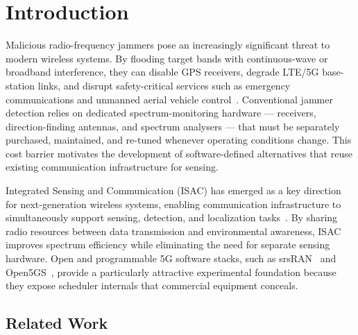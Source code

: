 \documentclass[conference]{IEEEtran}
\begin{document}
\section{Introduction}


Malicious radio-frequency jammers pose an increasingly significant threat
to modern wireless systems. By flooding target bands with continuous-wave
or broadband interference, they can disable GPS receivers, degrade LTE/5G
base-station links, and disrupt safety-critical services such as emergency
communications and unmanned aerial vehicle control~\cite{3gpp38211}.
Conventional jammer detection relies on dedicated spectrum-monitoring
hardware — receivers, direction-finding antennas, and spectrum analysers —
that must be separately purchased, maintained, and re-tuned whenever
operating conditions change. This cost barrier motivates the development
of software-defined alternatives that reuse existing communication
infrastructure for sensing.

Integrated Sensing and Communication (ISAC) has emerged as a key
direction for next-generation wireless systems, enabling communication
infrastructure to simultaneously support sensing, detection, and
localization tasks~\cite{1143830,article}. By sharing radio resources
between data transmission and environmental awareness, ISAC improves
spectrum efficiency while eliminating the need for separate sensing
hardware. Open and programmable 5G software stacks, such as
srsRAN~\cite{srsran_docs} and Open5GS~\cite{open5gs_site}, provide a
particularly attractive experimental foundation because they expose
scheduler internals that commercial equipment conceals.


\subsection*{Related Work}
\end{document}
